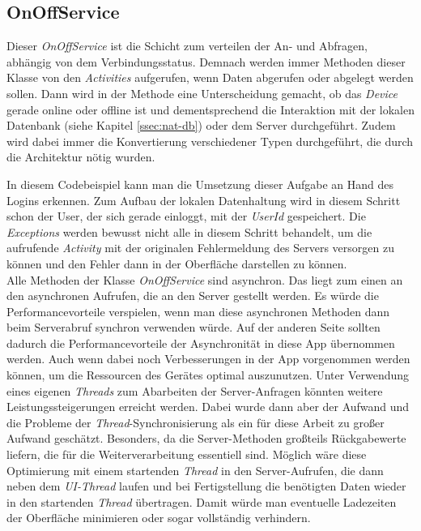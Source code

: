 \subsection{OnOffService}
\label{ssec:nat-onoffservice}
Dieser \textit{OnOffService} ist die Schicht zum verteilen der An- und Abfragen, abhängig von dem Verbindungsstatus. Demnach werden immer Methoden dieser Klasse von den \textit{Activities} aufgerufen, wenn Daten abgerufen oder abgelegt werden sollen. Dann wird in der Methode eine Unterscheidung gemacht, ob das \textit{Device} gerade online oder offline ist und dementsprechend die Interaktion mit der lokalen Datenbank (siehe Kapitel \ref{ssec:nat-db}) oder dem Server durchgeführt. Zudem wird dabei immer die Konvertierung verschiedener Typen durchgeführt, die durch die Architektur nötig wurden.

In diesem Codebeispiel kann man die Umsetzung dieser Aufgabe an Hand des Logins erkennen. Zum Aufbau der lokalen Datenhaltung wird in diesem Schritt schon der User, der sich gerade einloggt, mit der \textit{UserId} gespeichert. Die \textit{Exceptions} werden bewusst nicht alle in diesem Schritt behandelt, um die aufrufende \textit{Activity} mit der originalen Fehlermeldung des Servers versorgen zu können und den Fehler dann in der Oberfläche darstellen zu können.\\
Alle Methoden der Klasse \textit{OnOffService} sind asynchron. Das liegt zum einen an den asynchronen Aufrufen, die an den Server gestellt werden. Es würde die Performancevorteile verspielen, wenn man diese asynchronen Methoden dann beim Serverabruf synchron verwenden würde. Auf der anderen Seite sollten dadurch die Performancevorteile der Asynchronität in diese App übernommen werden. Auch wenn dabei noch Verbesserungen in der App vorgenommen werden können, um die Ressourcen des Gerätes optimal auszunutzen. Unter Verwendung eines eigenen \textit{Threads} zum Abarbeiten der Server-Anfragen könnten weitere Leistungssteigerungen erreicht werden. Dabei wurde dann aber der Aufwand und die Probleme der \textit{Thread}-Synchronisierung als ein für diese Arbeit zu großer Aufwand geschätzt. Besonders, da die Server-Methoden großteils Rückgabewerte liefern, die für die Weiterverarbeitung essentiell sind. Möglich wäre diese Optimierung mit einem startenden \textit{Thread} in den Server-Aufrufen, die dann neben dem \textit{UI-Thread} laufen und bei Fertigstellung die benötigten Daten wieder in den startenden \textit{Thread} übertragen. Damit würde man eventuelle Ladezeiten der Oberfläche minimieren oder sogar vollständig verhindern.

